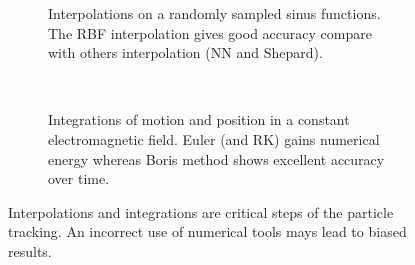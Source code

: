 \begin{figure}[!h]
	\begin{subfigure}{0.5\textwidth}
		
		\caption{Interpolations on a randomly sampled sinus functions. The RBF interpolation gives good accuracy compare with others interpolation (NN and Shepard).}
		\label{chap3:interpolation}
	\end{subfigure}
	~
	\begin{subfigure}{0.5\textwidth}
		
		\caption{Integrations of motion and position in a constant electromagnetic field. Euler (and RK) gains numerical energy whereas Boris method shows excellent accuracy over time.}
		\label{chap3:integration}
	\end{subfigure}
	\caption[Interpolations and integrations are critical steps of the particle tracking]{Interpolations and integrations are critical steps of the particle tracking. An incorrect use of numerical tools mays lead to biased results.}
	\label{chap3:TrackingPitfalls}
\end{figure}
